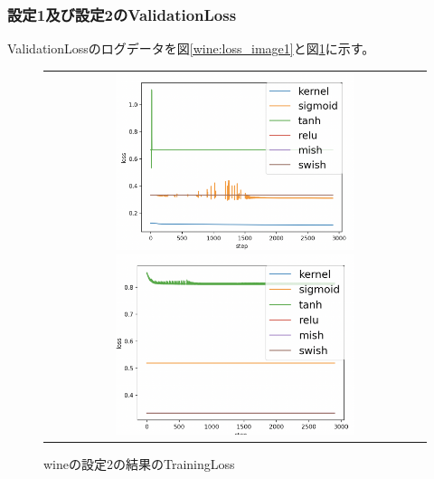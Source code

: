 \subsubsection{設定1及び設定2のValidationLoss}
\label{wine:loss}

ValidationLossのログデータを図\ref{wine:loss_image1}と図\ref{wine:loss_image2}に示す。

\begin{figure}[hbtp]
    \begin{center}
        \begin{tabular}{c}
            \begin{minipage}{0.5\hsize}
                \includegraphics[clip, width=7cm]{asset/wine_0.001_3000_3_015_sgd_non_kaiming_uniform.png}
                    \caption{wineの設定1の結果のTrainingLoss}
                     \label{wine:loss_image1}
            \end{minipage}
            \hspace{10pt}
            \begin{minipage}{0.5\hsize}
                \includegraphics[clip, width=7cm]{asset/wine_0.001_3000_3_015_adam_non_kaiming_uniform}
                    \caption{wineの設定2の結果のTrainingLoss}
                     \label{wine:loss_image2}
            \end{minipage}
        \end{tabular}
    \end{center}
\end{figure}


